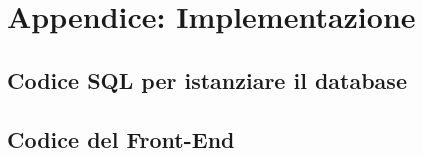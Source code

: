 \section{Appendice: Implementazione}

\subsection*{Codice SQL per istanziare il database}
%
%
\subsection*{Codice del Front-End}
%
%

